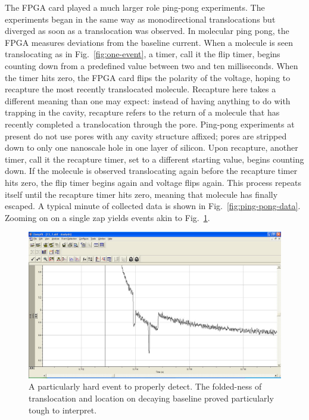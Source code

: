 \documentclass[aps,prl,preprint,groupedaddress]{revtex4}
\begin{document}
The FPGA card played a much larger role ping-pong experiments.
The experiments began in the same way as monodirectional translocations but diverged as soon as a translocation was observed.
In molecular ping pong, the FPGA measures deviations from the baseline current.
When a molecule is seen translocating as in Fig.~\ref{fig:one-event}, a timer, call it the flip timer, begins counting down from a predefined value between two and ten milliseconds.
When the timer hits zero, the FPGA card flips the polarity of the voltage, hoping to recapture the most recently translocated molecule.
Recapture here takes a different meaning than one may expect: instead of having anything to do with trapping in the cavity, recapture refers to the return of a molecule that has recently completed a translocation through the pore.
Ping-pong experiments at present do not use pores with any cavity structure affixed; pores are stripped down to only one nanoscale hole in one layer of silicon.
Upon recapture, another timer, call it the recapture timer, set to a different starting value, begins counting down.
If the molecule is observed translocating again before the recapture timer hits zero, the flip timer begins again and voltage flips again.
This process repeats itself until the recapture timer hits zero, meaning that molecule has finally escaped.
A typical minute of collected data is shown in Fig.~\ref{fig:ping-pong-data}.
Zooming on on a single zap yields events akin to Fig.~\ref{fig:tough-event}.

\begin{figure}[H]
\centering
\includegraphics[width=1\textwidth]{figures/tough-event}
\caption{A particularly hard event to properly detect.
The folded-ness of translocation and location on decaying baseline proved particularly tough to interpret.}
\label{fig:tough-event}
\end{figure}
\end{document}
